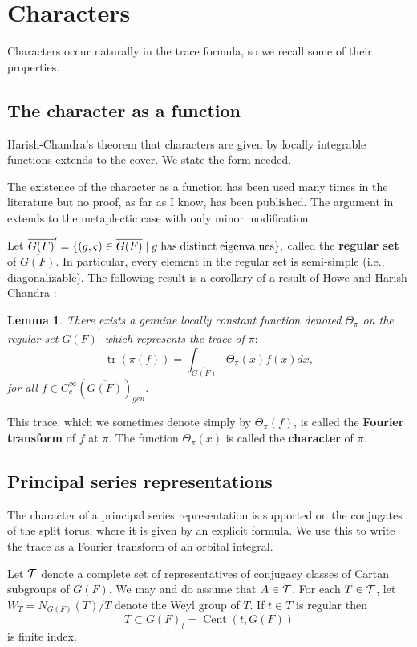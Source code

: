 \documentclass[12pt,letterpaper]{book}
\theoremstyle{plain}
\newtheorem{lemma}[theorem]{Lemma}
\theoremstyle{definition}
\theoremstyle{remark}
\theoremstyle{remark}
\newcommand{\tr}{\operatorname{tr}}
\begin{document}
\section{Characters}

Characters occur naturally in the trace formula, so we recall
some of their properties.

\subsection{The character as a function}

Harish-Chandra's theorem that characters are given by locally integrable functions extends to the cover. We state the form needed.


The existence of the character as a function has been used many times in
the literature but no proof, as far as I know, has been published.
The argument in \cite{S} extends to the metaplectic case with only
minor modification.

Let $\overline{G(F)}^{\prime }=\{(g,\varsigma )\in \overline{G(F)}%
\;|\;g\;{\rm has\;distinct\;eigenvalues}\},$ called the {\bf regular set} of
$\overline{G(F)}.$ In particular, every element in the regular set is
semi-simple (i.e., diagonalizable). The following result is a corollary of a
result of Howe and Harish-Chandra \cite{S}:

\begin{lemma}
There exists a genuine locally constant function denoted $\Theta _\pi $ on
the regular set $\overline{G(F)}^{\prime }$ which represents the trace of $%
\pi :$%
\[
\tr(\pi (f))=\int_{\overline{G(F)}}\Theta _\pi (x)f(x)dx,
\]
for all $f\in C_c^\infty (\overline{G(F)})_{gen}.$
\end{lemma}

This trace, which we sometimes denote simply by $\Theta _\pi (f)$, is called
the {\bf Fourier transform} of $f$ at $\pi $. The function $\Theta _\pi (x)$
is called the {\bf character} of $\pi $.

\subsection{Principal series representations}\label{sec:ps-char}

The character of a principal series representation is supported on the conjugates of the split torus, where it is given by an explicit formula. We use this to write the trace as a Fourier transform of an orbital integral.


Let ${\cal T}$ denote a complete set of representatives of conjugacy classes of
Cartan subgroups of $G(F)$. We may and do assume that $A\in {\cal T}$. For each
$T\in {\cal T}$, let $W_T=N_{G(F)}(T)/T$ denote the Weyl
group of $T$. If $t\in T$ is regular then
\[
T\subset G(F)_t=\operatorname{Cent}(t,G(F))
\]
is finite index.
\end{document}
